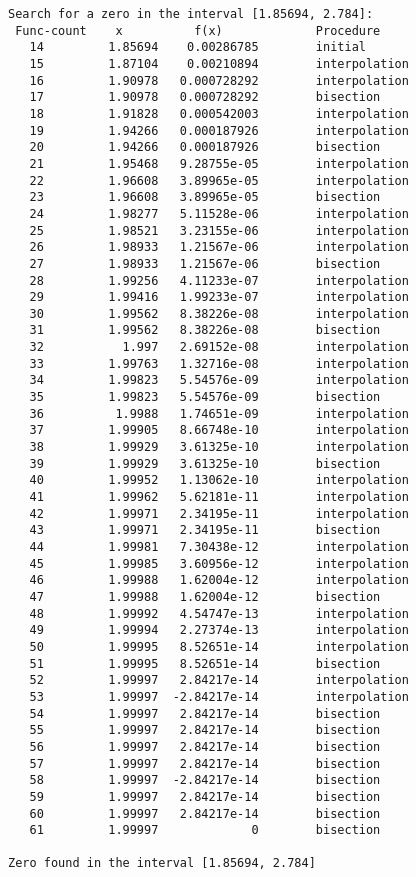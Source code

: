 \documentclass{article}
\begin{document}
\begin{verbatim}
Search for a zero in the interval [1.85694, 2.784]:
 Func-count    x          f(x)             Procedure
   14         1.85694    0.00286785        initial
   15         1.87104    0.00210894        interpolation
   16         1.90978   0.000728292        interpolation
   17         1.90978   0.000728292        bisection
   18         1.91828   0.000542003        interpolation
   19         1.94266   0.000187926        interpolation
   20         1.94266   0.000187926        bisection
   21         1.95468   9.28755e-05        interpolation
   22         1.96608   3.89965e-05        interpolation
   23         1.96608   3.89965e-05        bisection
   24         1.98277   5.11528e-06        interpolation
   25         1.98521   3.23155e-06        interpolation
   26         1.98933   1.21567e-06        interpolation
   27         1.98933   1.21567e-06        bisection
   28         1.99256   4.11233e-07        interpolation
   29         1.99416   1.99233e-07        interpolation
   30         1.99562   8.38226e-08        interpolation
   31         1.99562   8.38226e-08        bisection
   32           1.997   2.69152e-08        interpolation
   33         1.99763   1.32716e-08        interpolation
   34         1.99823   5.54576e-09        interpolation
   35         1.99823   5.54576e-09        bisection
   36          1.9988   1.74651e-09        interpolation
   37         1.99905   8.66748e-10        interpolation
   38         1.99929   3.61325e-10        interpolation
   39         1.99929   3.61325e-10        bisection
   40         1.99952   1.13062e-10        interpolation
   41         1.99962   5.62181e-11        interpolation
   42         1.99971   2.34195e-11        interpolation
   43         1.99971   2.34195e-11        bisection
   44         1.99981   7.30438e-12        interpolation
   45         1.99985   3.60956e-12        interpolation
   46         1.99988   1.62004e-12        interpolation
   47         1.99988   1.62004e-12        bisection
   48         1.99992   4.54747e-13        interpolation
   49         1.99994   2.27374e-13        interpolation
   50         1.99995   8.52651e-14        interpolation
   51         1.99995   8.52651e-14        bisection
   52         1.99997   2.84217e-14        interpolation
   53         1.99997  -2.84217e-14        interpolation
   54         1.99997   2.84217e-14        bisection
   55         1.99997   2.84217e-14        bisection
   56         1.99997   2.84217e-14        bisection
   57         1.99997   2.84217e-14        bisection
   58         1.99997  -2.84217e-14        bisection
   59         1.99997   2.84217e-14        bisection
   60         1.99997   2.84217e-14        bisection
   61         1.99997             0        bisection
 
Zero found in the interval [1.85694, 2.784]
\end{verbatim}
\end{document}
